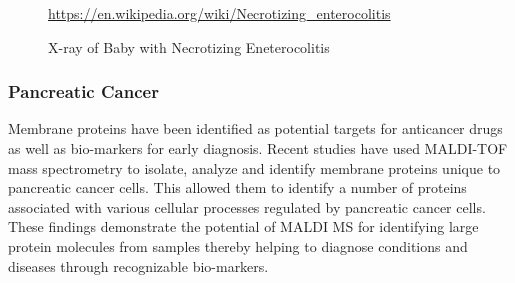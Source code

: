 \documentclass[letterpaper, 10 pt, conference]{ieeeconf}  %
\begin{document}
            \begin{figure}[h]
                \centering
            
                \caption{X-ray of Baby with Necrotizing Eneterocolitis}
                \tiny{\url{https://en.wikipedia.org/wiki/Necrotizing_enterocolitis}}

            \end{figure}

            \subsubsection[\textbf{Pancreatic Cancer}]{\textbf{Pancreatic Cancer}\autocite{R3,R4,R10}}\hfill \hfill

            Membrane proteins have been identified as potential targets for anticancer drugs as well as bio-markers for early diagnosis. Recent studies have used MALDI-TOF mass spectrometry to isolate, analyze and identify membrane proteins unique to pancreatic cancer cells. This allowed them to identify a number of proteins associated with various cellular processes regulated by pancreatic cancer cells. These findings demonstrate the potential of MALDI MS for identifying large protein molecules from samples thereby helping to diagnose conditions and diseases through recognizable bio-markers.
\end{document}
